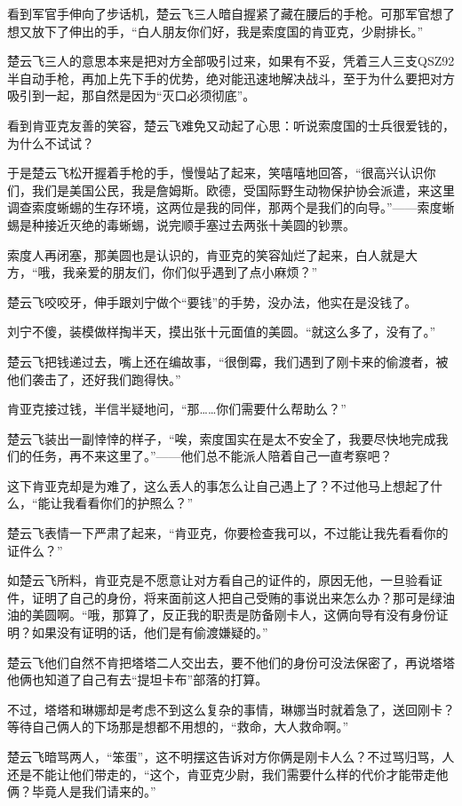 看到军官手伸向了步话机，楚云飞三人暗自握紧了藏在腰后的手枪。可那军官想了想又放下了伸出的手，“白人朋友你们好，我是索度国的肯亚克，少尉排长。”

楚云飞三人的意思本来是把对方全部吸引过来，如果有不妥，凭着三人三支QSZ92半自动手枪，再加上先下手的优势，绝对能迅速地解决战斗，至于为什么要把对方吸引到一起，那自然是因为“灭口必须彻底”。

看到肯亚克友善的笑容，楚云飞难免又动起了心思：听说索度国的士兵很爱钱的，为什么不试试？

于是楚云飞松开握着手枪的手，慢慢站了起来，笑嘻嘻地回答，“很高兴认识你们，我们是美国公民，我是詹姆斯。欧德，受国际野生动物保护协会派遣，来这里调查索度蜥蜴的生存环境，这两位是我的同伴，那两个是我们的向导。”——索度蜥蜴是种接近灭绝的毒蜥蜴，说完顺手塞过去两张十美圆的钞票。

索度人再闭塞，那美圆也是认识的，肯亚克的笑容灿烂了起来，白人就是大方，“哦，我亲爱的朋友们，你们似乎遇到了点小麻烦？”

楚云飞咬咬牙，伸手跟刘宁做个“要钱”的手势，没办法，他实在是没钱了。

刘宁不傻，装模做样掏半天，摸出张十元面值的美圆。“就这么多了，没有了。”

楚云飞把钱递过去，嘴上还在编故事，“很倒霉，我们遇到了刚卡来的偷渡者，被他们袭击了，还好我们跑得快。”

肯亚克接过钱，半信半疑地问，“那……你们需要什么帮助么？”

楚云飞装出一副悻悻的样子，“唉，索度国实在是太不安全了，我要尽快地完成我们的任务，再不来这里了。”——他们总不能派人陪着自己一直考察吧？

这下肯亚克却是为难了，这么丢人的事怎么让自己遇上了？不过他马上想起了什么，“能让我看看你们的护照么？”

楚云飞表情一下严肃了起来，“肯亚克，你要检查我可以，不过能让我先看看你的证件么？”

如楚云飞所料，肯亚克是不愿意让对方看自己的证件的，原因无他，一旦验看证件，证明了自己的身份，将来面前这人把自己受贿的事说出来怎么办？那可是绿油油的美圆啊。“哦，那算了，反正我的职责是防备刚卡人，这俩向导有没有身份证明？如果没有证明的话，他们是有偷渡嫌疑的。”

楚云飞他们自然不肯把塔塔二人交出去，要不他们的身份可没法保密了，再说塔塔他俩也知道了自己有去“提坦卡布”部落的打算。

不过，塔塔和琳娜却是考虑不到这么复杂的事情，琳娜当时就着急了，送回刚卡？等待自己俩人的下场那是想都不用想的，“救命，大人救命啊。”

楚云飞暗骂两人，“笨蛋”，这不明摆这告诉对方你俩是刚卡人么？不过骂归骂，人还是不能让他们带走的，“这个，肯亚克少尉，我们需要什么样的代价才能带走他俩？毕竟人是我们请来的。”

